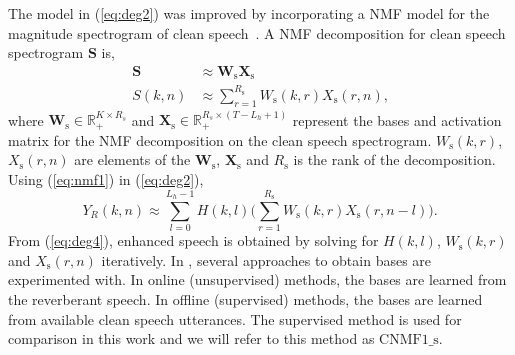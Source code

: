 The model in (\ref{eq:deg2}) was improved by incorporating a NMF model for the magnitude spectrogram of clean speech~\cite{mohammadiha2016speech,Mohammadiha2015}.
A NMF decomposition for clean speech spectrogram $\mathbf{S}$ is,
\begin{align}
\mathbf{S}&\approx \mathbf{W}_{\text{s}} \mathbf{X}_{\text{s}}\nonumber\\
S(k,n)&\approx\sum_{r=1}^{R_{\text{s}}} W_{\text{s}}(k,r)X_{\text{s}}(r,n)\text{,}
\label{eq:nmf1}
\end{align}
where $\mathbf{W}_{\text{s}}\in \mathbb{R}_+^{K \times R_s}$ and $\mathbf{X}_{\text{s}}\in \mathbb{R}_+^{R_s \times (T-L_h +1)}$ represent the bases and activation matrix for the NMF decomposition on the clean speech spectrogram. $W_{\text{s}}(k,r)$, $X_{\text{s}}(r,n)$ are elements of the $\mathbf{W}_{\text{s}}$, $\mathbf{X}_{\text{s}}$ and $R_\text{s}$ is the rank of the decomposition. Using (\ref{eq:nmf1}) in (\ref{eq:deg2}),
\begin{equation}
Y_R(k,n) \approx \sum_{l=0}^{L_h-1}H(k,l)\bigg(\sum_{r=1}^{R_{\text{s}}} W_{\text{s}}(k,r)X_{\text{s}}(r,n-l)\bigg)\text{.}
\label{eq:deg4}
\end{equation}
From (\ref{eq:deg4}), enhanced speech is obtained by solving for $H(k,l)$, $W_{\text{s}}(k,r)$ and $X_{\text{s}}(r,n)$ iteratively. In \cite{mohammadiha2016speech,Mohammadiha2015}, several approaches to obtain bases are experimented with. In online (unsupervised) methods, the bases are learned from the reverberant speech.
In offline (supervised) methods, the bases are learned from available clean speech utterances. The supervised method is used for comparison in this work and we will refer to this method as $\text{CNMF1\_s}$. 

